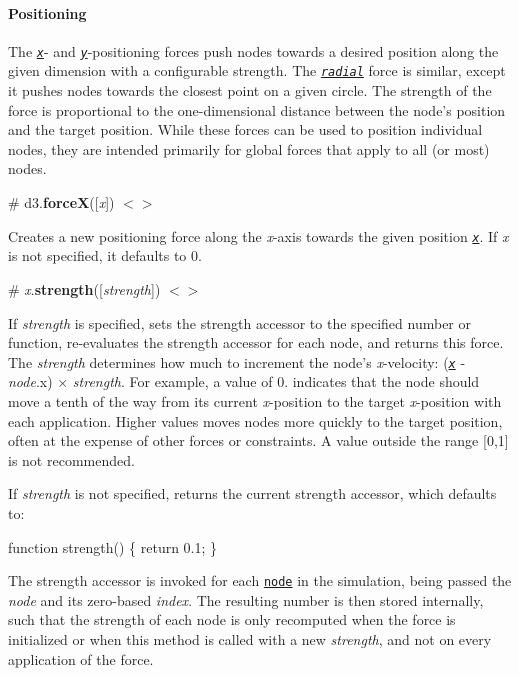 \paragraph*{Positioning}

The \href{#forceX}{\tt {\itshape x}}-\/ and \href{#forceY}{\tt {\itshape y}}-\/positioning forces push nodes towards a desired position along the given dimension with a configurable strength. The \href{#forceRadial}{\tt {\itshape radial}} force is similar, except it pushes nodes towards the closest point on a given circle. The strength of the force is proportional to the one-\/dimensional distance between the node’s position and the target position. While these forces can be used to position individual nodes, they are intended primarily for global forces that apply to all (or most) nodes.

\label{_forceX}%
\# d3.{\bfseries forceX}(\mbox{[}{\itshape x}\mbox{]}) \href{https://github.com/d3/d3-force/blob/master/src/x.js}{\tt $<$$>$}

Creates a new positioning force along the {\itshape x}-\/axis towards the given position \href{#x_x}{\tt {\itshape x}}. If {\itshape x} is not specified, it defaults to 0.

\label{_x_strength}%
\# {\itshape x}.{\bfseries strength}(\mbox{[}{\itshape strength}\mbox{]}) \href{https://github.com/d3/d3-force/blob/master/src/x.js#L32}{\tt $<$$>$}

If {\itshape strength} is specified, sets the strength accessor to the specified number or function, re-\/evaluates the strength accessor for each node, and returns this force. The {\itshape strength} determines how much to increment the node’s {\itshape x}-\/velocity\+: (\href{#x_x}{\tt {\itshape x}} -\/ {\itshape node}.x) × {\itshape strength}. For example, a value of 0. indicates that the node should move a tenth of the way from its current {\itshape x}-\/position to the target {\itshape x}-\/position with each application. Higher values moves nodes more quickly to the target position, often at the expense of other forces or constraints. A value outside the range \mbox{[}0,1\mbox{]} is not recommended.

If {\itshape strength} is not specified, returns the current strength accessor, which defaults to\+:


\begin{DoxyCode}
function strength() \{
  return 0.1;
\}
\end{DoxyCode}


The strength accessor is invoked for each \href{#simulation_nodes}{\tt node} in the simulation, being passed the {\itshape node} and its zero-\/based {\itshape index}. The resulting number is then stored internally, such that the strength of each node is only recomputed when the force is initialized or when this method is called with a new {\itshape strength}, and not on every application of the force.


